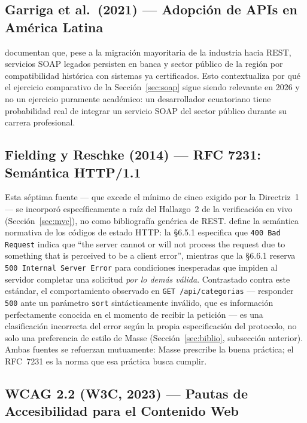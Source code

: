 \documentclass[12pt,a4paper]{article}
\begin{document}
\subsection{Garriga et al.\ (2021) --- Adopción de APIs en América Latina}

\textcite{garriga2021} documentan que, pese a la migración mayoritaria de la industria hacia
REST, servicios SOAP legados persisten en banca y sector público de la región por
compatibilidad histórica con sistemas ya certificados. Esto contextualiza por qué el ejercicio
comparativo de la Sección~\ref{sec:soap} sigue siendo relevante en 2026 y no un ejercicio
puramente académico: un desarrollador ecuatoriano tiene probabilidad real de integrar un
servicio SOAP del sector público durante su carrera profesional.

\subsection{Fielding y Reschke (2014) --- RFC 7231: Semántica HTTP/1.1}

Esta séptima fuente --- que excede el mínimo de cinco exigido por la Directriz~1 --- se
incorporó específicamente a raíz del Hallazgo~2 de la verificación en vivo
(Sección~\ref{sec:mvc}), no como bibliografía genérica de REST. \textcite{rfc7231} define la
semántica normativa de los códigos de estado HTTP: la \S6.5.1 especifica que
\texttt{400 Bad Request} indica que ``the server cannot or will not process the request due
to something that is perceived to be a client error'', mientras que la \S6.6.1 reserva
\texttt{500 Internal Server Error} para condiciones inesperadas que impiden al servidor
completar una solicitud \textit{por lo demás válida}. Contrastado contra este estándar, el
comportamiento observado en \texttt{GET /api/categorias} --- responder \texttt{500} ante un
parámetro \texttt{sort} sintácticamente inválido, que es información perfectamente conocida
en el momento de recibir la petición --- es una clasificación incorrecta del error según la
propia especificación del protocolo, no solo una preferencia de estilo de Masse
(Sección~\ref{sec:biblio}, subsección anterior). Ambas fuentes se refuerzan mutuamente: Masse
prescribe la buena práctica; el RFC~7231 es la norma que esa práctica busca cumplir.

\subsection{WCAG 2.2 (W3C, 2023) --- Pautas de Accesibilidad para el Contenido Web}
\end{document}
